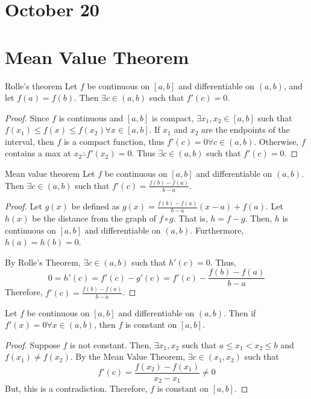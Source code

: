 \section{October 20}

\section{Mean Value Theorem}
\begin{theorem}{Rolle's theorem}{}
    Let $f$ be continuous on $[a,b]$ and differentiable on $(a,b)$, and let $f(a) = f(b)$. Then $\exists c \in (a,b)$ such that $f'(c) = 0$.
\end{theorem}
\begin{proof}
    Since $f$ is continuous and $[a, b]$ is compact, $\exists x_1, x_2 \in [a, b]$ such that $f(x_1) \leq f(x) \leq f(x_2) \forall x \in [a, b]$. If $x_1$ and $x_2$ are the endpoints of the interval, then $f$ is a compact function, thus $f'(c) = 0 \forall c \in (a, b)$. Otherwise, $f$ contains a max at $x_2 \therefore f'(x_2) = 0$. Thus $\exists c \in (a, b)$ such that $f'(c) = 0$.
\end{proof}

\begin{theorem}{Mean value theorem}{}
    Let $f$ be continuous on $[a,b]$ and differentiable on $(a,b)$. Then $\exists c \in (a,b)$ such that $f'(c) = \frac{f(b) - f(a)}{b - a}$.
\end{theorem}
\begin{proof}
    Let $g(x)$ be defined as $g(x) = \frac{f(b) - f(a)}{b - a} (x - a) + f(a)$. Let $h(x)$ be the distance from the graph of $f \circ g$. That is, $h = f - g$. Then, $h$ is continuous on $[a, b]$ and differentiable on $(a, b)$. Furthermore, $h(a) = h(b) = 0$.
    
    By Rolle's Theorem, $\exists c \in (a, b)$ such that $h'(c) = 0$. Thus, $$0 = h'(c) = f'(c) - g'(c) = f'(c) - \frac{f(b) - f(a)}{b - a}$$ Therefore, $f'(c) = \frac{f(b) - f(a)}{b - a}$.
\end{proof}

\begin{theorem}
    Let $f$ be continuous on $[a,b]$ and differentiable on $(a,b)$. Then if $f'(x) = 0 \forall x \in (a, b)$, then $f$ is constant on $[a, b]$.
\end{theorem}
\begin{proof}
    Suppose $f$ is not constant. Then, $\exists x_1, x_2$ such that $a \leq x_1 < x_2 \leq b$ and $f(x_1) \neq f(x_2)$. By the Mean Value Theorem, $\exists c \in (x_1, x_2)$ such that $$f'(c) = \frac{f(x_2) - f(x_1)}{x_2 - x_1} \neq 0$$ But, this is a contradiction. Therefore, $f$ is constant on $[a, b]$.
\end{proof}

